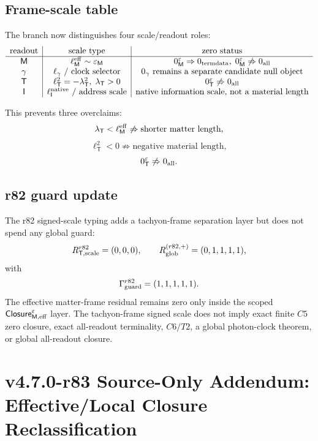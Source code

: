 \subsection*{Frame-scale table}
\label{subsec:r82-frame-scale-table}

The branch now distinguishes four scale/readout roles:
\[
\begin{array}{c|c|c}
\text{readout} & \text{scale type} & \text{zero status}\\
\hline
\mathsf M & \ell_{\mathsf M}^{\rm eff}\sim\varepsilon_{\mathsf M} &
0_{\mathsf M}^{\varepsilon}\Rightarrow0_{\rm termdata},\;0_{\mathsf M}^{\varepsilon}\not\Rightarrow0_{\rm all}\\
\gamma & \ell_{\gamma}\text{ / clock selector} &
0_{\gamma}\text{ remains a separate candidate null object}\\
\mathsf T & \ell_{\mathsf T}^{2}=-\lambda_{\mathsf T}^{2},\;\lambda_{\mathsf T}>0 &
0_{\mathsf T}^{\varepsilon}\not\Rightarrow0_{\rm all}\\
\mathsf I & \ell_{\mathsf I}^{\rm native}\text{ / address scale} &
\text{native information scale, not a material length}
\end{array}
\]

This prevents three overclaims:
\[
\lambda_{\mathsf T}<\ell_{\mathsf M}^{\rm eff}
\not\Rightarrow
\text{shorter matter length},
\]
\[
\ell_{\mathsf T}^{2}<0
\not\Rightarrow
\text{negative material length},
\]
\[
0_{\mathsf T}^{\varepsilon}
\not\Rightarrow
0_{\rm all}.
\]

\subsection*{r82 guard update}
\label{subsec:r82-guard-update}

The r82 signed-scale typing adds a tachyon-frame separation layer but does not spend any
global guard:
\[
R_{\mathsf T,\rm scale}^{r82}=(0,0,0),
\qquad
R_{\rm glob}^{(r82,+)}=(0,1,1,1,1),
\]
with
\[
\Gamma_{\rm guard}^{r82}=(1,1,1,1,1).
\]
The effective matter-frame residual remains zero only inside the scoped
\(\mathsf{Closure}_{\mathsf M,\rm eff}^{\varepsilon}\) layer.  The tachyon-frame signed
scale does not imply exact finite \(C5\) zero closure, exact all-readout terminality,
\(C6/T2\), a global photon-clock theorem, or global all-readout closure.



\section*{v4.7.0-r83 Source-Only Addendum: Effective/Local Closure Reclassification}
\label{sec:r83-effective-local-closure-reclassification}

